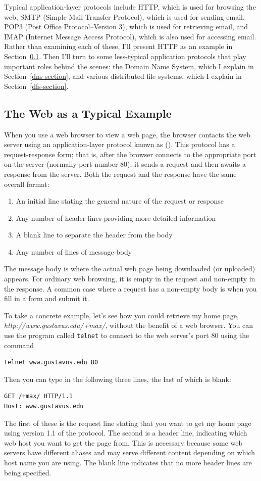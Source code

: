Typical application-layer protocols include HTTP, which is used for
browsing the web, SMTP (Simple Mail Transfer Protocol), which is used
for sending email, POP3 (Post Office Protocol--Version 3), which
is used for retrieving email, and IMAP (Internet Message Access Protocol), which is also used for
accessing email.  Rather than examining each of these, I'll present
HTTP as an example in Section~\ref{http-section}.  Then I'll turn to
some less-typical application protocols that play important roles
behind the scenes: the Domain Name System, which I explain in
Section~\ref{dns-section}, and various distributed file systems, which
I explain in Section~\ref{dfs-section}.

\subsection{The Web as a Typical Example}\label{http-section}

When you use a web browser to view a web page, the browser contacts the web
server using an application-layer protocol known as 
().  This protocol has a
request-response form; that is, after the browser connects to the
appropriate port on the server (normally port number 80), it sends a
request and then awaits a response from the server.  Both the request
and the response have the same overall format:
\begin{enumerate}
\item An initial line stating
the general nature of the request or response
\item Any number of header
lines providing more detailed information
\item A blank line to separate the header from the body
\item Any
number of lines of message body
\end{enumerate}
The message body is where the actual web page being downloaded (or
uploaded) appears.  For ordinary web browsing, it is empty in the request and
non-empty in the response.  A common case where a request has a
non-empty body is when you fill in a form and submit it.

To take a concrete example, let's see how you could retrieve my home
page, \textit{http://www.gustavus.edu/+max/}, without the benefit of a web
browser.  You can use the program called \verb|telnet| to connect to the
web server's port 80 using the command
\begin{verbatim}
telnet www.gustavus.edu 80
\end{verbatim}
Then you can type in the following three lines, the last of which is blank:
\begin{verbatim}
GET /+max/ HTTP/1.1
Host: www.gustavus.edu

\end{verbatim}
The first of these is the request line stating that you want to get my
home page using version 1.1 of the protocol.  The second is a header
line, indicating which web host you want to get the page from.  This
is necessary because some web servers have different aliases and may
serve different content depending on which host name you are using.
The blank line indicates that no more header lines are being
specified.

